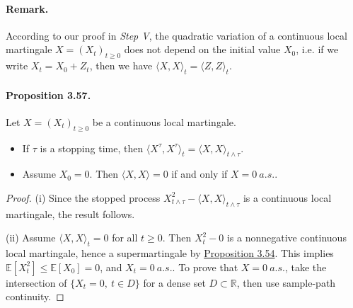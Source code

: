 \documentclass{article}
\numberwithin{equation}{section}
\newcommand{\E}{\mathbb{E}}
\theoremstyle{plain}
\theoremstyle{definition}
\begin{document}
\paragraph{Remark.} According to our proof in \textit{Step V}, the quadratic variation of a continuous local martingale $X=(X_t)_{t\geq 0}$ does not depend on the initial value $X_0$, i.e. if we write $X_t=X_0+Z_t$, then we have $\langle X,X\rangle_t = \langle Z,Z\rangle_t$.

\paragraph{Proposition 3.57.\label{prop:3.57}} Let $X=(X_t)_{t\geq 0}$ be a continuous local martingale.
\begin{itemize}
	\item[(i)] If $\tau$ is a stopping time, then $\langle X^\tau,X^\tau\rangle_t=\langle X,X\rangle_{t\wedge\tau}$.
	\item[(ii)] Assume $X_0=0$. Then $\langle X,X\rangle=0$ if and only if $X=0\ a.s.$.
\end{itemize}
\begin{proof}
(i) Since the stopped process $X_{t\wedge\tau}^2-\langle X,X\rangle_{t\wedge\tau}$ is a continuous local martingale, the result follows.

(ii) Assume $\langle X,X\rangle_t=0$ for all $t\geq 0$. Then $X_t^2 - 0$ is a nonnegative continuous local martingale, hence a supermartingale by \hyperref[prop:3.54]{Proposition 3.54}. This implies $\E[X_t^2]\leq\E[X_0]=0$, and $X_t=0\ a.s.$. To prove that $X=0\ a.s.$, take the intersection of $\{X_t=0,\ t\in D\}$ for a dense set $D\subset\mathbb{R}$, then use sample-path continuity.
\end{proof}
\end{document}
